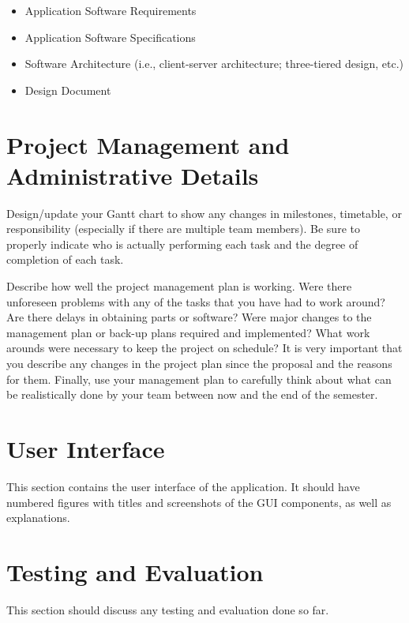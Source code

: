 \documentclass[letterpaper,12pt]{article}
\begin{document}
\begin{itemize}
  \item Application Software Requirements
  \item Application Software Specifications
  \item Software Architecture (i.e., client-server architecture; three-tiered
  design, etc.)
  \item Design Document
\end{itemize}

\label{software_requirements}
\label{software_specifications}
\label{software_design}

\newpage



\section{Project Management and Administrative Details}
Design/update your Gantt chart to show any changes in milestones, timetable, or
responsibility (especially if there are multiple team members). Be sure to
properly indicate who is actually performing each task and the degree of
completion of each task.

Describe how well the project management plan is working. Were there unforeseen
problems with any of the tasks that you have had to work around? Are there
delays in obtaining parts or software? Were major changes to the management plan
or back-up plans required and implemented? What work arounds were necessary to
keep the project on schedule? It is very important that you describe any changes
in the project plan since the proposal and the reasons for them.
Finally, use your management plan to carefully think about what can be
realistically done by your team between now and the end of the semester.

\newpage



\section{User Interface}
This section contains the user interface of the application. It should have
numbered figures with titles and screenshots of the GUI components, as well as
explanations.

\newpage



\section{Testing and Evaluation}
This section should discuss any testing and evaluation done so far.
\end{document}

